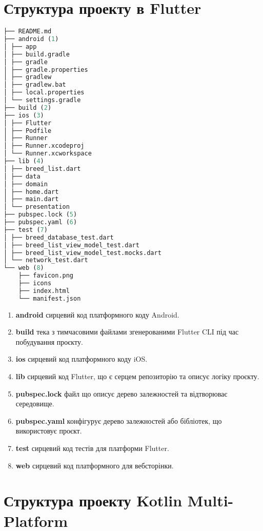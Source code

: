 \section{Структура проекту в Flutter}
\label{sec:flutter_structure_app}

\begin{lstlisting}[style=light, language=Python,label={lst:flutter_project_layout},caption=Flutter Project Layout]
├── README.md
├── android (1)
│ ├── app
│ ├── build.gradle
│ ├── gradle
│ ├── gradle.properties
│ ├── gradlew
│ ├── gradlew.bat
│ ├── local.properties
│ └── settings.gradle
├── build (2)
├── ios (3)
│ ├── Flutter
│ ├── Podfile
│ ├── Runner
│ ├── Runner.xcodeproj
│ └── Runner.xcworkspace
├── lib (4)
│ ├── breed_list.dart
│ ├── data
│ ├── domain
│ ├── home.dart
│ ├── main.dart
│ └── presentation
├── pubspec.lock (5)
├── pubspec.yaml (6)
├── test (7)
│ ├── breed_database_test.dart
│ ├── breed_list_view_model_test.dart
│ ├── breed_list_view_model_test.mocks.dart
│ └── network_test.dart
└── web (8)
    ├── favicon.png
    ├── icons
    ├── index.html
    └── manifest.json
\end{lstlisting}

\begin{enumerate}
    \item \textbf{android} сирцевий код платформного коду Android.
    \item \textbf{build} тека з тимчасовими файлами згенерованими Flutter CLI під час побудування проєкту.
    \item \textbf{ios} сирцевий код платформного коду iOS.
    \item \textbf{lib} сирцевий код Flutter, що є серцем репозиторію та описує логіку проєкту.
    \item \textbf{pubspec.lock} файл що описує дерево залежностей та відтворюває середовище.
    \item \textbf{pubspec.yaml} конфігурує дерево залежностей або бібліотек, що використовує проєкт.
    \item \textbf{test} сирцевий код тестів для платформи Flutter.
    \item \textbf{web} сирцевий код платформного для вебсторінки.
\end{enumerate}


\section{Структура проекту Kotlin Multi-Platform}
\label{sec:kmm_structure_app}

